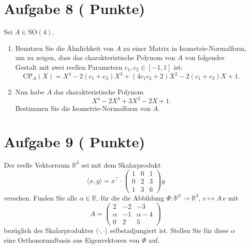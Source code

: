 \documentclass[11pt, a4paper]{article}
\newcommand{\aufgabe}[2]{%
  \section*{\Large\bfseries Aufgabe #1%
  \if\relax\detokenize{#2}\relax\else \hfill\normalfont\normalsize(#2 Punkte)\fi}%
  \vspace{-1.5ex}
}
\begin{document}
\aufgabe{8}{}
Sei $A\in \mathrm{SO}(4)$.
\begin{enumerate}
  \item Benutzen Sie die Ähnlichkeit von $A$ zu einer Matrix in Isometrie-Normalform, um zu zeigen, dass das charakteristische Polynom von $A$ von folgender Gestalt mit zwei reellen Parametern $c_1,c_2\in[-1,1]$ ist:
  \[
    \mathrm{CP}_A(X)=X^4-2(c_1+c_2)X^3+(4c_1c_2+2)X^2-2(c_1+c_2)X+1.
  \]
  \begin{framed}\end{framed}

  \item Nun habe $A$ das charakteristische Polynom
  \[
    X^4-2X^3+3X^2-2X+1.
  \]
  Bestimmen Sie die Isometrie-Normalform von $A$.
  \begin{framed}\end{framed}
\end{enumerate}

\aufgabe{9}{}
Der reelle Vektorraum $\mathbb{R}^3$ sei mit dem Skalarprodukt
\[
\langle x,y\rangle = x^\top\!\cdot
\begin{pmatrix}
1 & 0 & 1\\
0 & 2 & 3\\
1 & 3 & 6
\end{pmatrix} y
\]
versehen. Finden Sie alle $\alpha\in\mathbb{R}$, für die die Abbildung $\Phi:\mathbb{R}^3\to\mathbb{R}^3$, $v\mapsto A\,v$ mit
\[
A=
\begin{pmatrix}
2 & -2 & -3\\
\alpha & -1 & \alpha-4\\
0 & 2 & 5
\end{pmatrix}
\]
bezüglich des Skalarproduktes $\langle\cdot,\cdot\rangle$ selbstadjungiert ist. Stellen Sie für diese $\alpha$ eine Orthonormalbasis aus Eigenvektoren von $\Phi$ auf.
\begin{framed}\end{framed}
\end{document}
